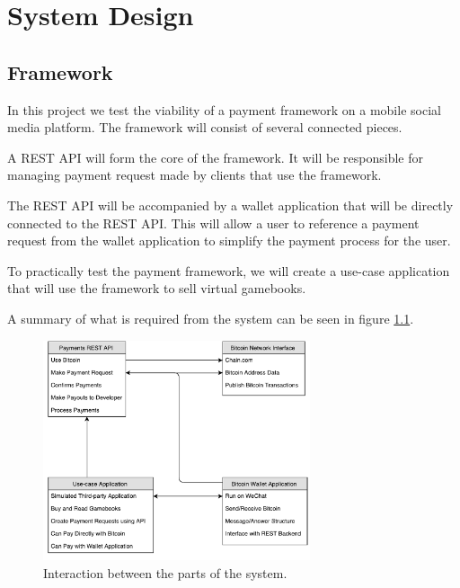 \chapter{System Design}
\label{chp:System Design}


\section{Framework}

In this project we test the viability of a payment framework on a mobile social media platform. The framework will consist of several connected pieces.

A REST API will form the core of the framework. It will be responsible for managing payment request made by clients that use the framework.

The REST API will be accompanied by a wallet application that will be directly connected to the REST API. This will allow a user to reference a payment request from the wallet application to simplify the payment process for the user.

To practically test the payment framework, we will create a use-case application that will use the framework to sell virtual gamebooks. 


A summary of what is required from the system can be seen in figure \ref{fig:summary_framework}.

\begin{figure}
  \centering
  	\caption{Interaction between the parts of the system.} 
    \includegraphics[width=0.7\textwidth]{figs/Summary.pdf}
   
   \label{fig:summary_framework}
\end{figure}

